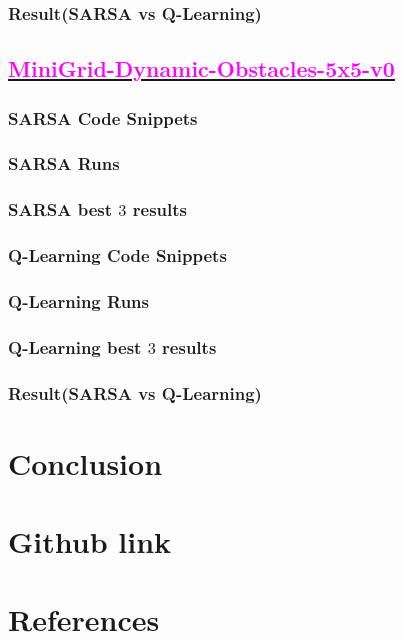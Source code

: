 \documentclass[11pt, a4]{article}
\begin{document}
			\subsubsection{Result(SARSA vs Q-Learning)}
		\subsection{\href{https://github.com/RitabrataMandal/RL-DA6400-assignment_1/tree/main/minigrid_world}{\textcolor{magenta}{MiniGrid-Dynamic-Obstacles-5x5-v0}}}
			\subsubsection{SARSA Code Snippets}
			\subsubsection{SARSA Runs}
			\subsubsection{SARSA best $3$ results}
			\subsubsection{Q-Learning Code Snippets}
			\subsubsection{Q-Learning Runs}
			\subsubsection{Q-Learning best $3$ results}
			\subsubsection{Result(SARSA vs Q-Learning)}
	\section{Conclusion}
	\section{Github link}	
	\section{References}
\end{document}
